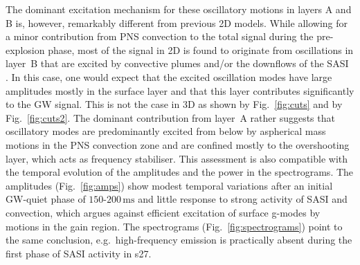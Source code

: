 The dominant excitation mechanism for these oscillatory motions in layers A and B is, however,
remarkably different from previous 2D models.
While allowing for a minor contribution from PNS
convection to the total signal during the pre-explosion phase, most of the signal in 2D is
found to originate from oscillations in layer~B that are excited by convective plumes and/or the
downflows of the SASI \citep{marek_08,murphy_09,mueller_13}.
In this case, one would expect that the excited oscillation modes have
large amplitudes mostly in the surface layer and that this layer
contributes significantly to the GW signal. This is not the case in
3D as shown by Fig.~\ref{fig:cuts} and by Fig.~\ref{fig:cuts2}.
The dominant contribution from layer~A rather suggests that
oscillatory modes are predominantly excited from below by aspherical mass
motions in the PNS convection zone and are confined mostly to the overshooting layer, which
acts as frequency stabiliser.
This assessment is also compatible with the temporal
evolution of the amplitudes and the power in the spectrograms.
The amplitudes (Fig.~\ref{fig:amps}) show modest
temporal variations after an initial GW-quiet
phase of $150 \text{-}200 \, \mathrm{ms}$ and little response
to strong activity of SASI and convection, which argues
against efficient excitation of surface g-modes by motions
in the gain region. The spectrograms
(Fig.~\ref{fig:spectrograms}) point to the
same conclusion, e.g.\ high-frequency emission is practically
absent during the first phase of SASI activity in  s27.

